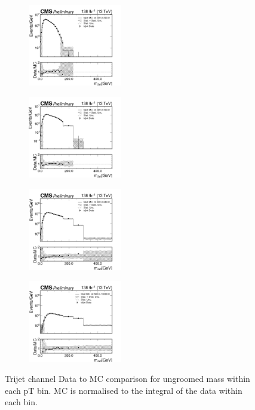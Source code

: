 \begin{figure}[h!]
  \centering
  \begin{subfigure}
    \centering
    
    \includegraphics[width=0.45\textwidth]{figures/multijet/trijet/trijet_m_200_290.png}
  \end{subfigure}
  \begin{subfigure}
    \centering
    \includegraphics[width=0.45\textwidth]{figures/multijet/trijet/trijet_m_290_400.png}
  \end{subfigure}
  \begin{subfigure}
    \centering
    \includegraphics[width=0.45\textwidth]{figures/multijet/trijet/trijet_m_400_680.png}
  \end{subfigure}
  \begin{subfigure}
    \centering
    \includegraphics[width=0.45\textwidth]{figures/multijet/trijet/trijet_m_680_13000.png}
  \end{subfigure}
  \caption{Trijet channel  Data to MC comparison for ungroomed mass within each pT bin. MC is normalised to the integral of the data within each \pt bin.}
  \label{fig:19}
\end{figure}
